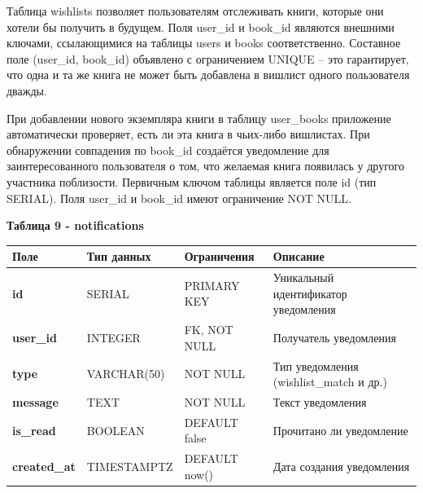 \documentclass[14pt,a4paper]{extarticle}
\begin{document}
Таблица wishlists позволяет пользователям отслеживать книги, которые они
хотели бы получить в будущем. Поля user\_id и book\_id являются внешними
ключами, ссылающимися на таблицы users и books соответственно. Составное
поле (user\_id, book\_id) объявлено с ограничением UNIQUE -- это
гарантирует, что одна и та же книга не может быть добавлена в вишлист
одного пользователя дважды.

При добавлении нового экземпляра книги в таблицу user\_books приложение
автоматически проверяет, есть ли эта книга в чьих-либо вишлистах. При
обнаружении совпадения по book\_id создаётся уведомление для
заинтересованного пользователя о том, что желаемая книга появилась у
другого участника поблизости. Первичным ключом таблицы является поле id
(тип SERIAL). Поля user\_id и book\_id имеют ограничение NOT NULL.

\newpage
\textbf{Таблица 9 - notifications}

\begin{longtable}[]{@{}
  >{\centering\arraybackslash}p{}
  >{\centering\arraybackslash}p{}
  >{\centering\arraybackslash}p{}
  >{\centering\arraybackslash}p{}@{}}
\toprule\noalign{}
\begin{minipage}[b]{\linewidth}\centering
\textbf{Поле}
\end{minipage} & \begin{minipage}[b]{\linewidth}\centering
\textbf{Тип данных}
\end{minipage} & \begin{minipage}[b]{\linewidth}\centering
\textbf{Ограничения}
\end{minipage} & \begin{minipage}[b]{\linewidth}\centering
\textbf{Описание}
\end{minipage} \\
\midrule\noalign{}
\endhead
\bottomrule\noalign{}
\endlastfoot
\textbf{id} & SERIAL & PRIMARY KEY & Уникальный идентификатор
уведомления \\
\textbf{user\_id} & INTEGER & FK, NOT NULL & Получатель уведомления \\
\textbf{type} & VARCHAR(50) & NOT NULL & Тип уведомления
(wishlist\_match и др.) \\
\textbf{message} & TEXT & NOT NULL & Текст уведомления \\
\textbf{is\_read} & BOOLEAN & DEFAULT false & Прочитано ли
уведомление \\
\textbf{created\_at} & TIMESTAMPTZ & DEFAULT now() & Дата создания
уведомления \\
\end{longtable}
\end{document}

